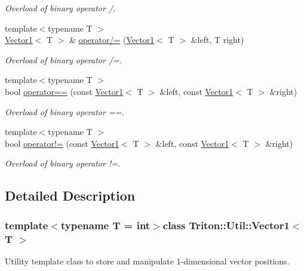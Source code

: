 \begin{DoxyCompactItemize}
\begin{DoxyCompactList}\small\item\em Overload of binary operator /. \end{DoxyCompactList}\item 
{\footnotesize template$<$typename T $>$ }\\\hyperlink{class_triton_1_1_util_1_1_vector1}{Vector1}$<$ T $>$ \& \hyperlink{class_triton_1_1_util_1_1_vector1_adc6bf55881fc995e32d2941a03ac34d2}{operator/=} (\hyperlink{class_triton_1_1_util_1_1_vector1}{Vector1}$<$ T $>$ \&left, T right)
\begin{DoxyCompactList}\small\item\em Overload of binary operator /=. \end{DoxyCompactList}\item 
{\footnotesize template$<$typename T $>$ }\\bool \hyperlink{class_triton_1_1_util_1_1_vector1_a6245507d9a9d81223c8c15fdc757dd49}{operator==} (const \hyperlink{class_triton_1_1_util_1_1_vector1}{Vector1}$<$ T $>$ \&left, const \hyperlink{class_triton_1_1_util_1_1_vector1}{Vector1}$<$ T $>$ \&right)
\begin{DoxyCompactList}\small\item\em Overload of binary operator ==. \end{DoxyCompactList}\item 
{\footnotesize template$<$typename T $>$ }\\bool \hyperlink{class_triton_1_1_util_1_1_vector1_af85453ff46dabcad25f3aa58621e763d}{operator!=} (const \hyperlink{class_triton_1_1_util_1_1_vector1}{Vector1}$<$ T $>$ \&left, const \hyperlink{class_triton_1_1_util_1_1_vector1}{Vector1}$<$ T $>$ \&right)
\begin{DoxyCompactList}\small\item\em Overload of binary operator !=. \end{DoxyCompactList}\end{DoxyCompactItemize}


\subsection{Detailed Description}
\subsubsection*{template$<$typename T = int$>$class Triton\+::\+Util\+::\+Vector1$<$ T $>$}

Utility template class to store and manipulate 1-\/dimensional vector positions. 


